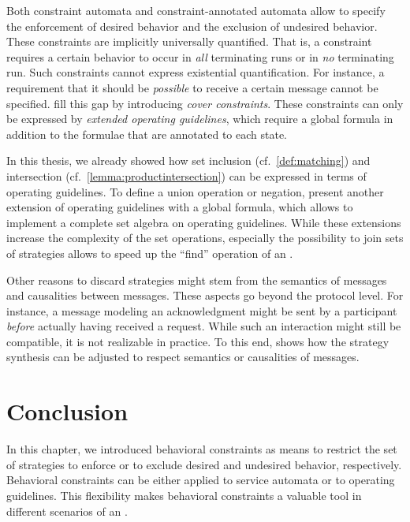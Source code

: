 Both constraint automata and constraint-annotated automata allow to specify the enforcement of desired behavior and the exclusion of undesired behavior. These constraints are implicitly universally quantified. That is, a constraint requires a certain behavior to occur in \emph{all} terminating runs or in \emph{no} terminating run. Such constraints cannot express existential quantification. For instance, a requirement that it should be \emph{possible} to receive a certain message cannot be specified. \citet{StahlW_2008_bpm} fill this gap by introducing \emph{cover constraints}. These constraints can only be expressed by \emph{extended operating guidelines}, which require a global formula in addition to the formulae that are annotated to each state.

In this thesis, we already showed how set inclusion (cf.~\autoref{def:matching}) and intersection (cf.~\autoref{lemma:productintersection}) can be expressed in terms of operating guidelines. To define a union operation or negation, \citet{KaschnerW_2009_bpm} present another extension of operating guidelines with a global formula, which allows to implement a complete set algebra on operating guidelines. While these extensions increase the complexity of the set operations, especially the possibility to join sets of strategies allows to speed up the ``find'' operation of an .

Other reasons to discard strategies might stem from the semantics of messages and causalities between messages. These aspects go beyond the protocol level. For instance, a message modeling an acknowledgment might be sent by a participant \emph{before} actually having received a request. While such an interaction might still be compatible, it is not realizable in practice. To this end, \citet{Wolf_2008_awpn,Wolf_2008_topnoc} shows how the strategy synthesis can be adjusted to respect semantics or causalities of messages.





\section{Conclusion}
\label{sect:validation_conclusion}

In this chapter, we introduced behavioral constraints as means to restrict the set of strategies to enforce or to exclude desired and undesired behavior, respectively. Behavioral constraints can be either applied to service automata or to operating guidelines. This flexibility makes behavioral constraints a valuable tool in different scenarios of an .

